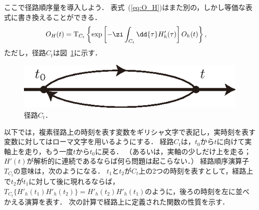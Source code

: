 \documentclass[a4paper,10pt]{jsarticle}
\begin{document}
ここで径路順序量を導入しよう．
表式~(\ref{eq:O_H})はまた別の，しかし等価な表式に書き換えることができる．
\begin{align}
O_H (t)
	& = \mathrm{T}_{C_t} \left\{ \exp \left[ - \zi \int_{C_t} \dd{\tau} H'_h (\tau) \right] O_h (t) \right\}
\label{eq:O_H_Ct}
,\end{align}
ただし，径路$C_t$は図~\ref{fig:4.1}に示す．
\begin{figure}[thbp]
\centering
\includegraphics[width=0.5\linewidth]{4.1.eps}
\caption{\label{fig:4.1}径路$C_t$．}
\end{figure}
以下では，複素径路上の時刻を表す変数をギリシャ文字で表記し，実時刻を表す変数に対してはローマ文字を用いるようにする．
経路$C_t$は，$t_0$から$t$に向けて実軸上を走り，もう一度$t$から$t_0$に戻る．
（あるいは，実軸の少しだけ上を走る；$H' (t)$が解析的に連続であるならば何ら問題は起こらない．）
経路順序演算子$T_{C_t}$の意味は，次のようになる．
$t_1$と$t_2$が$C_t$上の2つの時刻を表すとして，経路上で$t_2$が$t_1$に対して後に現れるならば，$T_{C_t} \{H'_h (t_1) H'_h (t_2)\} = H'_h (t_2) H'_h (t_1)$のように，後ろの時刻を左に並べかえる演算を表す．
次の計算で経路上に定義された関数の性質を示す．
\end{document}

